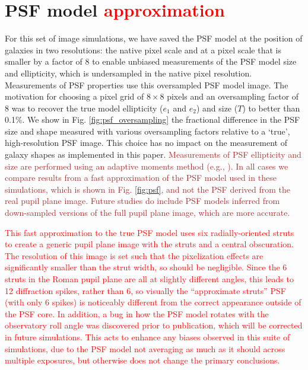 \documentclass[usenatbib]{mnras}
\newcommand{\changetext}[1]{\textcolor{brown}{#1}}
\newcommand{\changetexttwo}[1]{\textcolor{red}{#1}}
\begin{document}
\section{PSF model \changetexttwo{approximation}}
\label{app:psf_resol}

For this set of image simulations, we have saved the PSF model at the position of galaxies in two resolutions: the native pixel scale and at a pixel scale that is smaller by a factor of 8 to enable unbiased measurements of the PSF model size and ellipticity, which is undersampled in the native pixel resolution. Measurements of PSF properties use this oversampled PSF model image. The motivation for choosing a pixel grid of $8\times8$ pixels and an oversampling factor of 8 was to recover the true model ellipticity ($e_1$ and $e_2$) and size ($T$) to better than 0.1\%. We show in Fig. \ref{fig:psf_oversampling} the fractional difference in the PSF size and shape measured with various oversampling factors relative to a `true', high-resolution PSF image. This choice has no impact on the measurement of galaxy shapes as implemented in this paper. \changetext{Measurements of PSF ellipticity and size are performed using an adaptive moments method (e.g., \cite{2003MNRAS.343..459H}). In all cases we compare results from a fast approximation of the PSF model used in these simulations, which is shown in Fig. \ref{fig:psf}, and not the PSF derived from the real pupil plane image. Future studies do include PSF models inferred from down-sampled versions of the full pupil plane image, which are more accurate.}

\changetexttwo{This fast approximation to the true PSF model uses six radially-oriented struts to create a generic pupil plane image with the struts and a central obscuration. The resolution of this image is set such that the pixelization effects are significantly smaller than the strut width, so should be negligible. Since the 6 struts in the Roman pupil plane are all at slightly different angles, this leads to 12 diffraction spikes, rather than 6, so visually the “approximate struts” PSF (with only 6 spikes) is noticeably different from the correct appearance outside of the PSF core. In addition, a bug in how the PSF model rotates with the observatory roll angle was discovered prior to publication, which will be corrected in future simulations. This acts to enhance any biases observed in this suite of simulations, due to the PSF model not averaging as much as it should across multiple exposures, but otherwise does not change the primary conclusions.}
 
\end{document}
